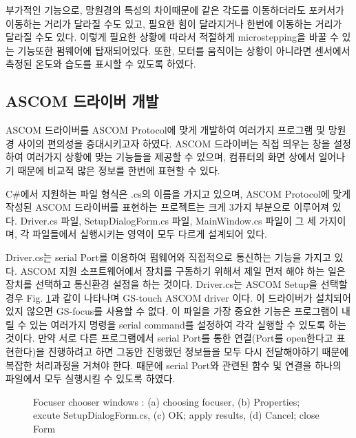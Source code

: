 부가적인 기능으로, 망원경의 특성의 차이때문에 같은 각도를 이동하더라도 포커서가 이동하는 거리가 달라질 수도 있고, 필요한 힘이 달라지거나 한번에 이동하는 거리가 달라질 수도 있다. 이렇게 필요한 상황에 따라서 적절하게 microstepping을 바꿀 수 있는 기능또한 펌웨어에 탑재되어있다. 또한, 모터를 움직이는 상황이 아니라면 센서에서 측정된 온도와 습도를 표시할 수 있도록 하였다.

\subsection{ASCOM 드라이버 개발}

ASCOM 드라이버를 ASCOM Protocol에 맞게 개발하여 여러가지 프로그램 및 망원경 사이의 편의성을 증대시키고자 하였다. ASCOM 드라이버는 직접 띄우는 창을 설정하여 여러가지 상황에 맞는 기능들을 제공할 수 있으며, 컴퓨터의 화면 상에서 일어나기 때문에 비교적 많은 정보를 한번에 표현할 수 있다.

C\#에서 지원하는 파일 형식은 .cs의 이름을 가지고 있으며, ASCOM Protocol에 맞게 작성된 ASCOM 드라이버를 표현하는 프로젝트는 크게 3가지 부분으로 이루어져 있다. Driver.cs 파일, SetupDialogForm.cs 파일, MainWindow.cs 파일이 그 세 가지이며, 각 파일들에서 실행시키는 영역이 모두 다르게 설계되어 있다.

Driver.cs는 serial Port를 이용하여 펌웨어와 직접적으로 통신하는 기능을 가지고 있다. ASCOM 지원 소프트웨어에서 장치를 구동하기 위해서 제일 먼저 해야 하는 일은 장치를 선택하고 통신환경 설정을 하는 것이다. Driver.cs는 ASCOM Setup을 선택할 경우 Fig. \ref{fig:focuserchooser}과 같이 나타나며 GS-touch ASCOM driver 이다. 이 드라이버가 설치되어 있지 않으면 GS-focus를 사용할 수 없다. 이 파일을 가장 중요한 기능은 프로그램이 내릴 수 있는 여러가지 명령을 serial command를 설정하여 각각 실행할 수 있도록 하는 것이다. 만약 서로 다른 프로그램에서 serial Port를 통한 연결(Port를 open한다고 표현한다)을 진행하려고 하면 그동안 진행했던 정보들을 모두 다시 전달해야하기 때문에 복잡한 처리과정을 거쳐야 한다. 때문에 serial Port와 관련된 함수 및 연결을 하나의 파일에서 모두 실행시킬 수 있도록 하였다.

\begin{figure}[h]
	\begin{center}
	\end{center}
	\caption{Focuser chooser windows : (a) choosing focuser, (b) Properties; excute SetupDialogForm.cs, (c) OK; apply results, (d) Cancel; close Form}
\label{fig:focuserchooser}	
\end{figure}

